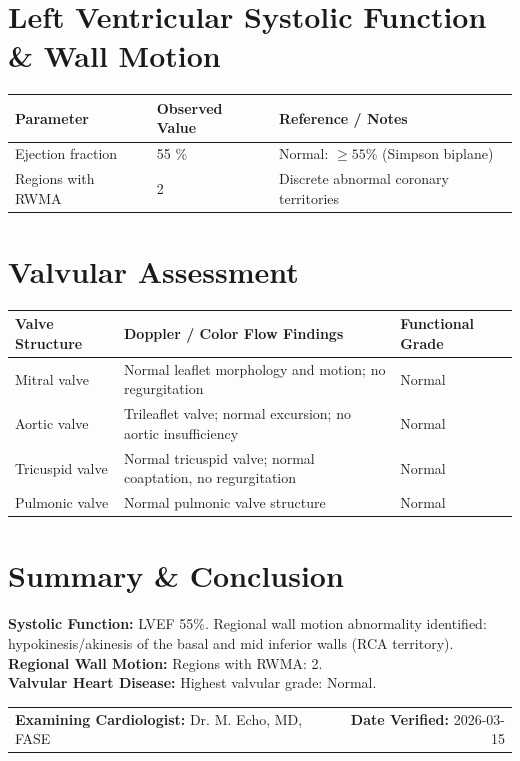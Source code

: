 \documentclass[10pt,a4paper]{article}
\begin{document}
\section*{Left Ventricular Systolic Function \& Wall Motion}

\begin{tabular}{@{} p{6.8cm} p{2.8cm} p{5.5cm} @{}}
  \toprule
  \textbf{Parameter} & \textbf{Observed Value} & \textbf{Reference / Notes} \\
  \midrule
  Ejection fraction & 55 \% & Normal: $\ge 55$\% (Simpson biplane) \\
  Regions with RWMA & 2 & Discrete abnormal coronary territories \\
  \bottomrule
\end{tabular}

\vspace{10pt}

\section*{Valvular Assessment}

\begin{tabular}{@{} p{3.2cm} p{8.4cm} p{3.2cm} @{}}
  \toprule
  \textbf{Valve Structure} & \textbf{Doppler / Color Flow Findings} & \textbf{Functional Grade} \\
  \midrule
  Mitral valve & Normal leaflet morphology and motion; no regurgitation & Normal \\
  Aortic valve & Trileaflet valve; normal excursion; no aortic insufficiency & Normal \\
  Tricuspid valve & Normal tricuspid valve; normal coaptation, no regurgitation & Normal \\
  Pulmonic valve & Normal pulmonic valve structure & Normal \\
  \bottomrule
\end{tabular}

\vspace{10pt}

\section*{Summary \& Conclusion}

\noindent
\textbf{Systolic Function:} LVEF 55\%. Regional wall motion abnormality identified: hypokinesis/akinesis of the basal and mid inferior walls (RCA territory).\\
\textbf{Regional Wall Motion:} Regions with RWMA: 2.\\
\textbf{Valvular Heart Disease:} Highest valvular grade: Normal.

\vspace{18pt}

\noindent
\begin{tabular*}{\textwidth}{@{} l @{\extracolsep{\fill}} r @{}}
  \textbf{Examining Cardiologist:} Dr. M. Echo, MD, FASE & \textbf{Date Verified:} 2026-03-15 \\
\end{tabular*}
\end{document}
